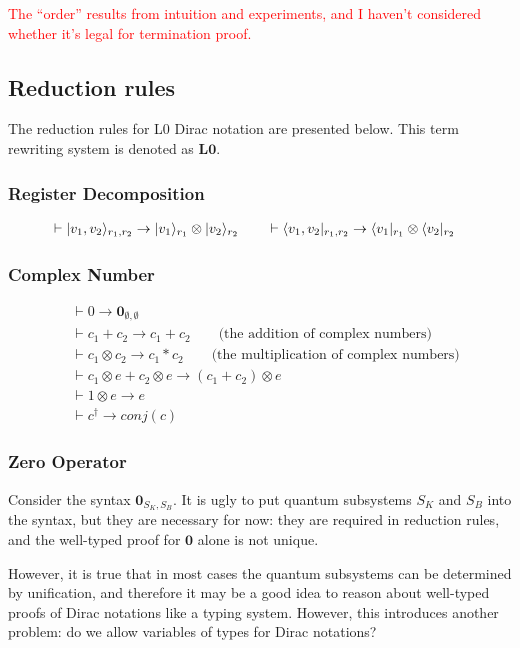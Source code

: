 \textcolor{red}{The ``order'' results from intuition and experiments, and I haven't considered whether it's legal for termination proof.}

\subsection{Reduction rules}
The reduction rules for L0 Dirac notation are presented below. This term rewriting system is denoted as $\textbf{L0}$.


\subsubsection*{Register Decomposition}
\begin{align*}
  & \vdash |v_1, v_2\rangle_{r_1, r_2} \to |v_1\rangle_{r_1} \otimes |v_2\rangle_{r_2} \qquad \vdash \langle v_1, v_2|_{r_1, r_2} \to \langle v_1|_{r_1} \otimes \langle v_2|_{r_2} 
\end{align*}

\subsubsection*{Complex Number}
\begin{align*}
  & \vdash 0 \to \textbf{0}_{\emptyset, \emptyset}\\
  & \vdash c_1 + c_2 \to c_1 + c_2\qquad \text{(the addition of complex numbers)}\\
  & \vdash c_1 \otimes c_2 \to c_1 * c_2\qquad \text{(the multiplication of complex numbers)}\\
  & \vdash c_1 \otimes e + c_2 \otimes e \to (c_1 + c_2) \otimes e\\
  & \vdash 1 \otimes e \to e\\
  & \vdash c^\dagger \to conj(c)
\end{align*}

\subsubsection*{Zero Operator}
Consider the syntax $\textbf{0}_{S_K, S_B}$. It is ugly to put quantum subsystems $S_K$ and $S_B$ into the syntax, but they are necessary for now: they are required in reduction rules, and the well-typed proof for $\textbf{0}$ alone is not unique.

However, it is true that in most cases the quantum subsystems can be determined by unification, and therefore it may be a good idea to reason about well-typed proofs of Dirac notations like a typing system. However, this introduces another problem: do we allow variables of types for Dirac notations?


